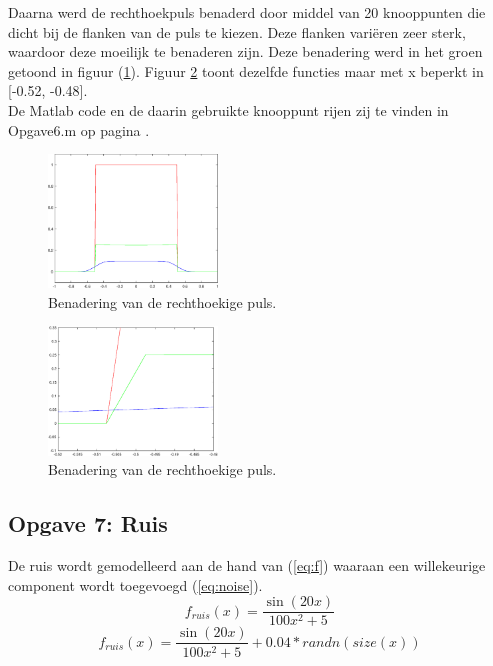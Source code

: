 \documentclass[a4paper]{article}
\newcommand{\opgave}[1]{\subsection{Opgave #1}}
\begin{document}
Daarna werd de rechthoekpuls benaderd door middel van 20 knooppunten die dicht bij de flanken van de puls te kiezen. Deze flanken vari\"eren zeer sterk, waardoor deze moeilijk te benaderen zijn. Deze benadering werd in het groen getoond in figuur (\ref{fig:rectan}). Figuur \ref{fig:rectanZoom} toont dezelfde functies maar met x beperkt in [-0.52, -0.48]. \\

De Matlab code en de daarin gebruikte knooppunt rijen zij te vinden in Opgave6.m op pagina \pageref{sec:code6}.
\begin{figure}[H]
	\begin{center} 
		\includegraphics[width=0.4\textwidth]{Rectan.eps}
	\end{center}
	\caption{Benadering van de rechthoekige puls.}
	\label{fig:rectan}
\end{figure}

\begin{figure}[H]
	\begin{center} 
		\includegraphics[width=0.4\textwidth]{RectanZoom.eps}
	\end{center}
	\caption{Benadering van de rechthoekige puls.}
	\label{fig:rectanZoom}
\end{figure}
\newpage

\opgave{7: Ruis}\label{sec:oef7}
De ruis wordt gemodelleerd aan de hand van (\ref{eq:f}) waaraan een willekeurige component wordt toegevoegd (\ref{eq:noise}).
\begin{equation}\label{eq:f}
	f_{ruis}(x) = \frac{\sin{(20x)}}{100x^2+5}
\end{equation}
\begin{equation}\label{eq:noise}
	f_{ruis}(x) = \frac{\sin{(20x)}}{100x^2+5} + 0.04*randn(size(x))
\end{equation}
\end{document}
